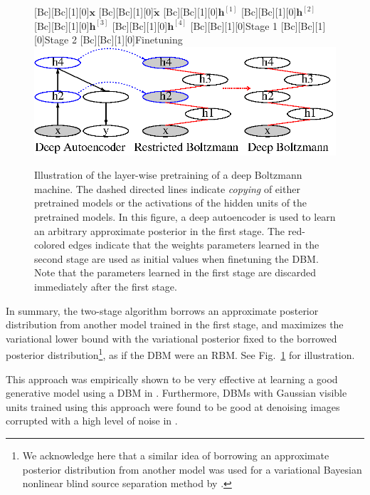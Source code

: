 \documentclass[dissertation,nocontribution,draft*]{aaltoseries}
\newcommand{\qlay}[1]{\left[#1\right]}
\newcommand{\vect}[1]{\mathbf{#1}}
\newcommand{\vh}[0]{\vect{h}}
\newcommand{\vx}[0]{\vect{x}}
\begin{document}
\begin{figure}[t]
    \centering
    [Bc][Bc][1][0]{$\vx$}
    [Bc][Bc][1][0]{$\tilde{\vx}$}
    [Bc][Bc][1][0]{$\vh^{\qlay{1}}$}
    [Bc][Bc][1][0]{$\vh^{\qlay{2}}$}
    [Bc][Bc][1][0]{$\vh^{\qlay{3}}$}
    [Bc][Bc][1][0]{$\vh^{\qlay{4}}$}
    [Bc][Bc][1][0]{Stage 1}
    [Bc][Bc][1][0]{Stage 2}
    [Bc][Bc][1][0]{Finetuning}
    \includegraphics[width=0.85\columnwidth]{figures/pretrain_dbm2.eps}
    \caption{Illustration of the layer-wise pretraining of
    a deep Boltzmann machine. The dashed directed lines
    indicate \textit{copying} of either pretrained models or
    the activations of the hidden units of the pretrained
    models. In this figure, a deep autoencoder is used to
    learn an arbitrary approximate posterior in the first
    stage. The red-colored edges indicate that the weights
    parameters learned in the second stage are used as
    initial values when finetuning the DBM. Note that the
    parameters learned in the first stage are discarded
    immediately after the first stage.}
    \label{fig:two_stage_pretraining}
\end{figure}

In summary, the two-stage algorithm borrows an approximate
posterior distribution from another model trained in the
first stage, and maximizes the variational lower bound with
the variational posterior fixed to the borrowed posterior
distribution\footnote{
We acknowledge here that a similar idea of borrowing an
approximate posterior distribution from another model was
used for a variational Bayesian nonlinear blind source
separation method by \citet{Honkela2004}.
}, as if the DBM were an RBM. See
Fig.~\ref{fig:two_stage_pretraining} for illustration.

This approach was empirically shown to be very effective at
learning a good generative model using a DBM in
. Furthermore, DBMs with Gaussian
visible units trained using this approach were found to be
good at denoising images corrupted with a high level of noise
in .
\end{document}
